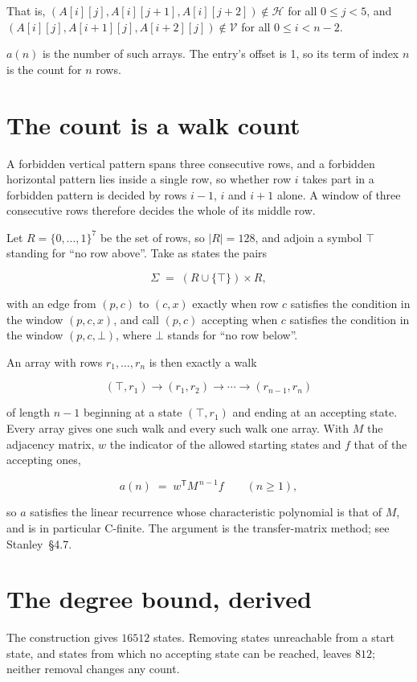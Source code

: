 \documentclass[11pt]{article}
\theoremstyle{definition}
\begin{document}
That is, $(A[i][j],A[i][j{+}1],A[i][j{+}2]) \notin \mathcal{H}$ for all $0 \le j < 5$, and $(A[i][j],A[i{+}1][j],A[i{+}2][j]) \notin \mathcal{V}$ for all $0 \le i < n-2$.

$a(n)$ is the number of such arrays. The entry's offset is 1, so its term of index $n$ is the count for $n$ rows.

\section{The count is a walk count}

A forbidden vertical pattern spans three consecutive rows, and a forbidden horizontal pattern lies inside a single row, so whether row $i$ takes part in a forbidden pattern is decided by rows $i-1$, $i$ and $i+1$ alone. A window of three consecutive rows therefore decides the whole of its middle row.

Let $R = \{0,\dots,1\}^{7}$ be the set of rows, so $|R| = 128$, and adjoin a symbol $\top$ standing for ``no row above''. Take as states the pairs

\[\Sigma \;=\; (R \cup \{\top\}) \times R,\]

with an edge from $(p,c)$ to $(c,x)$ exactly when row $c$ satisfies the condition in the window $(p,c,x)$, and call $(p,c)$ accepting when $c$ satisfies the condition in the window $(p,c,\bot)$, where $\bot$ stands for ``no row below''.

An array with rows $r_1,\dots,r_n$ is then exactly a walk

\[(\top,r_1) \to (r_1,r_2) \to \cdots \to (r_{n-1},r_n)\]

of length $n-1$ beginning at a state $(\top,r_1)$ and ending at an accepting state. Every array gives one such walk and every such walk one array. With $M$ the adjacency matrix, $w$ the indicator of the allowed starting states and $f$ that of the accepting ones,

\[a(n) \;=\; w^{\mathsf T} M^{\,n-1} f \qquad (n \ge 1),\]

so $a$ satisfies the linear recurrence whose characteristic polynomial is that of $M$, and is in particular C-finite. The argument is the transfer-matrix method; see Stanley~\S4.7.

\section{The degree bound, derived}

The construction gives $16512$ states. Removing states unreachable from a start state, and states from which no accepting state can be reached, leaves $812$; neither removal changes any count.
\end{document}
